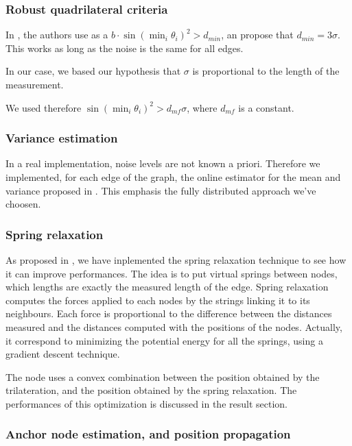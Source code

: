 \documentclass[letterpaper, 10 pt, conference]{ieeeconf}  %
\begin{document}
\subsubsection{Robust quadrilateral criteria}

In \cite{MooreTeller}, the authors use as a  $b \cdot \sin(\min_i \theta_i)^2 > d_{min}$, an propose that $d_{min}=3\sigma$. This works as long as the noise is the same for all edges. 

In our case, we based our hypothesis that $\sigma$ is proportional to the length of the measurement.

We used therefore $\sin(\min_i \theta_i)^2 > d_{mf} \sigma$, where $d_{mf}$ is a constant.

\subsubsection{Variance estimation}

In a real implementation, noise levels are not known a priori. Therefore we implemented, for each edge of the graph, the online estimator for the mean and variance proposed in \cite{Knuth}. This emphasis the fully distributed approach we've choosen.

\subsubsection{Spring relaxation}

As proposed in \cite{MooreTeller}, we have inplemented the spring relaxation technique to see how it can improve performances. The idea is to put virtual springs between nodes, which lengths are exactly the measured length of the edge. Spring relaxation computes the forces applied to each nodes by the strings linking it to its neighbours. Each force is proportional to the difference between the distances measured and the distances computed with the positions of the nodes. Actually, it correspond to minimizing the potential energy for all the springs, using a gradient descent technique.

The node uses a convex combination between the position obtained by the trilateration, and the position obtained by the spring relaxation. The performances of this optimization is discussed in the result section.

\subsubsection{Anchor node estimation, and position propagation}
\end{document}

